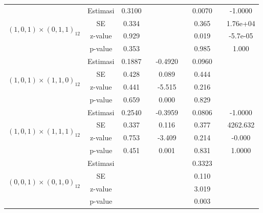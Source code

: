 \begin{enumerate}[label=\alph*.]
\begin{longtable}{|c|c|c|c|c|c|c|c|c|}
            \multirow{4}{*}{$(1,0,1)\times(0,1,1)_{12}$}
            & Estimasi & 0.3100  & {} & {} & {} & 0.0070 & {} & -1.0000\\ \cline{2-9}
            & SE       & 0.334 & {} & {} & {} & 0.365 & {} & 1.76e+04\\ \cline{2-9}
            & z-value  & 0.929  & {} & {} & {} & 0.019 & {}& -5.7e-05\\ \cline{2-9}
            & p-value  & 0.353 & {} & {} & {} & 0.985 & {} & 1.000\\ \hline

            \multirow{4}{*}{$(1,0,1)\times(1,1,0)_{12}$}
            & Estimasi & 0.1887  & {} & -0.4920 & {} & 0.0960 & {} & {}\\ \cline{2-9}
            & SE       & 0.428 & {} & 0.089 & {} & 0.444 & {} & {}\\ \cline{2-9}
            & z-value  & 0.441  & {} & -5.515 & {} & 0.216 & {}& {}\\ \cline{2-9}
            & p-value  & 0.659 & {} & 0.000 & {} & 0.829 & {} & {}\\ \hline

            \multirow{4}{*}{$(1,0,1)\times(1,1,1)_{12}$}
            & Estimasi & 0.2540  & {} & -0.3959 & {} & 0.0806 & {} & -1.0000\\ \cline{2-9}
            & SE       & 0.337 & {} & 0.116 & {} & 0.377 & {} & 4262.632\\ \cline{2-9}
            & z-value  & 0.753  & {} & -3.409 & {} & 0.214 & {}& -0.000\\ \cline{2-9}
            & p-value  & 0.451 & {} & 0.001 & {} & 0.831 & {} & 1.0000\\ \hline

            \multirow{4}{*}{$(0,0,1)\times(0,1,0)_{12}$}
            & Estimasi & {} & {} & {} & {} & 0.3323 & {} & {}\\ \cline{2-9}
            & SE       & {} & {} & {} & {} & 0.110 & {} & {}\\ \cline{2-9}
            & z-value  & {} & {} & {} & {} & 3.019 & {}& {}\\ \cline{2-9}
            & p-value  & {} & {} & {} & {} & 0.003 & {} & {}\\ \hline


\end{longtable}
\end{enumerate}
